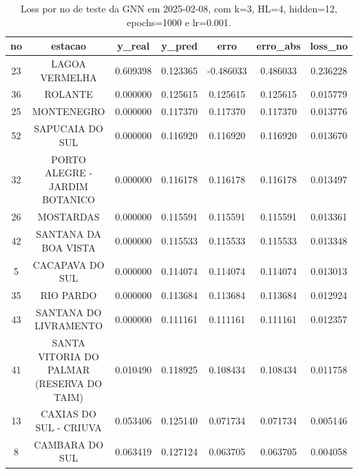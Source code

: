 \begin{table}[h]
\centering
\caption{Loss por no de teste da GNN em 2025-02-08, com k=3, HL=4, hidden=12, epochs=1000 e lr=0.001.}
\label{tab:gnn_loss_k3_hl4_h12_e1000_d20250208}
\begin{tabular}{ccccccc}
\toprule
no & estacao & y\_real & y\_pred & erro & erro\_abs & loss\_no \\
\midrule
23 & LAGOA VERMELHA & 0.609398 & 0.123365 & -0.486033 & 0.486033 & 0.236228 \\
36 & ROLANTE & 0.000000 & 0.125615 & 0.125615 & 0.125615 & 0.015779 \\
25 & MONTENEGRO & 0.000000 & 0.117370 & 0.117370 & 0.117370 & 0.013776 \\
52 & SAPUCAIA DO SUL & 0.000000 & 0.116920 & 0.116920 & 0.116920 & 0.013670 \\
32 & PORTO ALEGRE - JARDIM BOTANICO & 0.000000 & 0.116178 & 0.116178 & 0.116178 & 0.013497 \\
26 & MOSTARDAS & 0.000000 & 0.115591 & 0.115591 & 0.115591 & 0.013361 \\
42 & SANTANA DA BOA VISTA & 0.000000 & 0.115533 & 0.115533 & 0.115533 & 0.013348 \\
5 & CACAPAVA DO SUL & 0.000000 & 0.114074 & 0.114074 & 0.114074 & 0.013013 \\
35 & RIO PARDO & 0.000000 & 0.113684 & 0.113684 & 0.113684 & 0.012924 \\
43 & SANTANA DO LIVRAMENTO & 0.000000 & 0.111161 & 0.111161 & 0.111161 & 0.012357 \\
41 & SANTA VITORIA DO PALMAR (RESERVA DO TAIM) & 0.010490 & 0.118925 & 0.108434 & 0.108434 & 0.011758 \\
13 & CAXIAS DO SUL - CRIUVA & 0.053406 & 0.125140 & 0.071734 & 0.071734 & 0.005146 \\
8 & CAMBARA DO SUL & 0.063419 & 0.127124 & 0.063705 & 0.063705 & 0.004058 \\
\bottomrule
\end{tabular}
\end{table}
